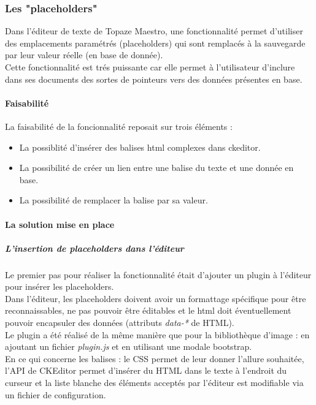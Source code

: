 \subsubsection{Les "placeholders"}
Dans l'éditeur de texte de Topaze Maestro, une fonctionnalité permet d'utiliser des emplacements paramétrés (placeholders) qui sont remplacés à la sauvegarde par leur valeur réelle (en base de donnée). \\
Cette fonctionnalité est trés puissante car elle permet à l'utilisateur d'inclure dans ses documents des sortes de pointeurs vers des données présentes en base. 

\paragraph*{Faisabilité\\}
La faisabilité de la foncionnalité reposait sur trois éléments : %
\begin{itemize}
\item La possiblité d'insérer des balises html complexes dans ckeditor.
\item La possibilité de créer un lien entre une balise du texte et une donnée en base.
\item La possibilité de remplacer la balise par sa valeur.
\end{itemize}

\paragraph*{La solution mise en place}
\subparagraph*{L'insertion de placeholders dans l'éditeur}
Le premier pas pour réaliser la fonctionnalité était d'ajouter un plugin à l'éditeur pour insérer les placeholders.\\
Dans l'éditeur, les placeholders doivent avoir un formattage spécifique pour être reconnaissables, ne pas pouvoir être éditables et le html doit éventuellement pouvoir encapsuler des données (attributs \textit{data-*} de HTML).\\

Le plugin a été réalisé de la même manière que pour la bibliothèque d'image : en ajoutant un fichier \textit{plugin.js} et en utilisant une modale bootstrap.\\
En ce qui concerne les balises : le CSS permet de leur donner l'allure souhaitée, l'API de CKEditor permet d'insérer du HTML dans le texte à l'endroit du curseur et la liste blanche des éléments acceptés par l'éditeur est modifiable via un fichier de configuration.

